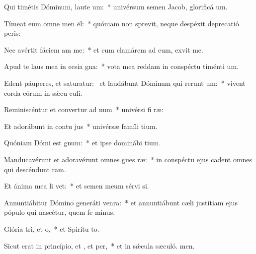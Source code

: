 \item Qui timétis Dóminum, laute um:~* univérsum semen Jacob, glorificá um.
\item Tímeat eum omne men ël:~* quóniam non sprevit, neque despéxit deprecatió peris:
\item Nec avértit fáciem am  me:~* et cum clamárem ad eum, exvit me.
\item Apud te laus mea in ecsia gna:~* vota mea reddam in conspéctu timénti um.
\item Edent páuperes, et saturatur:~\pscross{} et laudábunt Dóminum qui rerunt um:~* vivent corda eórum in sǽcu culi.
\item Reminiscéntur et convertur ad num~* univérsi fi ræ:
\item Et adorábunt in contu jus~* univérsæ famíli tium.
\item Quóniam Dómi est gnum:~* et ipse dominábi tium.
\item Manducavérunt et adoravérunt omnes gues ræ:~* in conspéctu ejus cadent omnes qui descéndunt  ram.
\item Et ánima mea li vet:~* et semen meum sérvi si.
\item Annuntiábitur Dómino generáti venra:~* et annuntiábunt cæli justítiam ejus pópulo qui nascétur, quem fe minus.
\item Glória tri, et o,~* et Spirítu to.
\item Sicut erat in princípio, et , et per,~* et in sǽcula sæculó. men.
